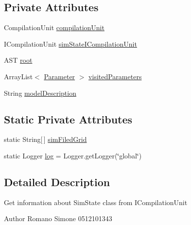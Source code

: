 \subsection*{Private Attributes}
\begin{DoxyCompactItemize}
\item 
Compilation\-Unit \hyperlink{classit_1_1isislab_1_1masonhelperdocumentation_1_1analizer_1_1_sim_state_analizer_a27bcb22bcbdd19a4b4a744a564489e1d}{compilation\-Unit}
\item 
I\-Compilation\-Unit \hyperlink{classit_1_1isislab_1_1masonhelperdocumentation_1_1analizer_1_1_sim_state_analizer_ab9778ffe58c423156222c36e9d0f7c5a}{sim\-State\-I\-Compilation\-Unit}
\item 
A\-S\-T \hyperlink{classit_1_1isislab_1_1masonhelperdocumentation_1_1analizer_1_1_sim_state_analizer_acb0b59c4c3e5d2f326d75a95aaac7b5d}{root}
\item 
Array\-List$<$ \hyperlink{classit_1_1isislab_1_1masonhelperdocumentation_1_1analizer_1_1_parameter}{Parameter} $>$ \hyperlink{classit_1_1isislab_1_1masonhelperdocumentation_1_1analizer_1_1_sim_state_analizer_a5d09f5b05d69fbf599a274dce43934b2}{visited\-Parameters}
\item 
String \hyperlink{classit_1_1isislab_1_1masonhelperdocumentation_1_1analizer_1_1_sim_state_analizer_ac8f5070813b06b98ba48c864498b1c64}{model\-Description}
\end{DoxyCompactItemize}
\subsection*{Static Private Attributes}
\begin{DoxyCompactItemize}
\item 
static String\mbox{[}$\,$\mbox{]} \hyperlink{classit_1_1isislab_1_1masonhelperdocumentation_1_1analizer_1_1_sim_state_analizer_a558bb0807bb266f5ec5ef24c97b08c02}{sim\-Filed\-Grid}
\item 
static Logger \hyperlink{classit_1_1isislab_1_1masonhelperdocumentation_1_1analizer_1_1_sim_state_analizer_a51418f0c9e5ceb332de189516ef923d2}{log} = Logger.\-get\-Logger(\char`\"{}global\char`\"{})
\end{DoxyCompactItemize}


\subsection{Detailed Description}
Get information about Sim\-State class from I\-Compilation\-Unit \begin{DoxyAuthor}{Author}
Romano Simone 0512101343 
\end{DoxyAuthor}


